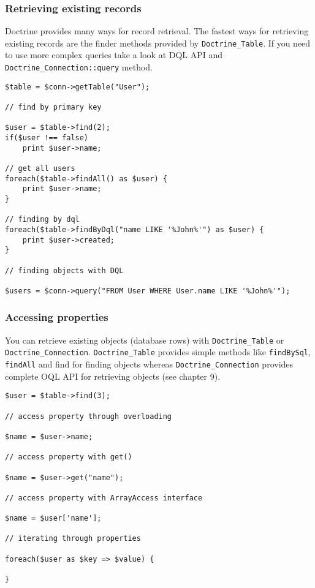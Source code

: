 \documentclass[11pt,a4paper]{report}
\begin{document}
\subsubsection{Retrieving existing records}
Doctrine provides many ways for record retrieval. The fastest ways for retrieving existing records are the finder methods provided by \texttt{Doctrine\_Table}. If you need to use more complex queries take a look at DQL API and \texttt{Doctrine\_Connection::query} method.

\begin{verbatim}
$table = $conn->getTable("User");

// find by primary key

$user = $table->find(2);
if($user !== false)
    print $user->name;

// get all users
foreach($table->findAll() as $user) {
    print $user->name;
}

// finding by dql
foreach($table->findByDql("name LIKE '%John%'") as $user) {
    print $user->created;
}

// finding objects with DQL

$users = $conn->query("FROM User WHERE User.name LIKE '%John%'");
\end{verbatim}

\subsubsection{Accessing properties}
You can retrieve existing objects (database rows) with \texttt{Doctrine\_Table} or \texttt{Doctrine\_Connection}. \texttt{Doctrine\_Table} provides simple methods like \texttt{findBySql}, \texttt{findAll} and find for finding objects whereas \texttt{Doctrine\_Connection} provides complete OQL API for retrieving objects (see chapter 9).

\begin{verbatim}
$user = $table->find(3);

// access property through overloading

$name = $user->name;

// access property with get()

$name = $user->get("name");

// access property with ArrayAccess interface

$name = $user['name'];

// iterating through properties

foreach($user as $key => $value) {

}
\end{verbatim}
\end{document}
